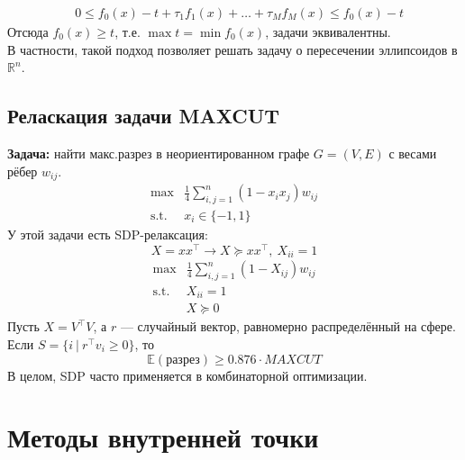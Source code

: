 \documentclass[11pt,a4paper]{report}
\def\E{\mathbb{E}}
\def\Real{\mathbb{R}}
\def\ge{\geqslant}
\theoremstyle{definition}
\theoremstyle{definition}
\theoremstyle{definition}
\begin{document}
\begin{enumerate}
\begin{align*}
			& 0 \leq f_0(x) - t + \tau_1 f_1(x) + \ldots + \tau_Mf_M(x) \leq f_0(x) - t 
		\end{align*}
		Отсюда $ f_{0}(x) \ge t $, т.е. $\max t = \min f_{0}(x)$, задачи эквивалентны.\\
		В частности, такой подход позволяет решать задачу о пересечении эллипсоидов в $ \Real^n $.
	\end{enumerate}
	\subsection{Реласкация задачи MAXCUT}
	\textbf{Задача:} найти макс.разрез в неориентированном графе $ G = (V, E) $ с весами рёбер $ w_{ij} $.
	\begin{align*}
		\max& \frac{1}{4} \sum_{i,j=1}^{n} (1 - x_i x_j) w_{ij}\\
		\text{s.t. }& x_{i} \in \{-1, 1\}
	\end{align*}
	У этой задачи есть SDP-релаксация: 
	$$
		X = xx^{\top} \to X \succeq xx^\top,\ X_{ii} = 1
	$$
	\begin{align*}
		\max& \frac{1}{4} \sum_{i,j=1}^{n} (1 - X_{ij}) w_{ij}\\
		\text{s.t. }& X_{ii} = 1\\
								& X \succeq 0
	\end{align*}
	Пусть $ X = V^{\top} V $, а $ r $ — случайный вектор, равномерно распределённый на сфере.\\
	Если $ S = \{ i\ |\ r^\top v_i \ge 0 \} $, то 
	$$
		\E (\text{разрез}) \ge 0.876 \cdot MAXCUT
	$$
	В целом, SDP часто применяется в комбинаторной оптимизации.
	\section{Методы внутренней точки}
\end{document}
